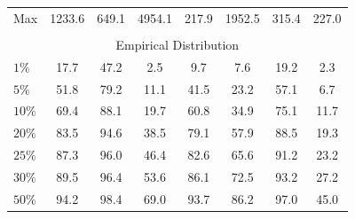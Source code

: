 \begin{center}
\begin{tabular*}{\textwidth}{@{\extracolsep{\fill}}lccccccc}
Max        & 1233.6& 649.1& 4954.1& 217.9& 1952.5& 315.4& 227.0\\ 
 \multicolumn{8}{c}{}\\ 
 \multicolumn{8}{c}{Empirical Distribution}\\ 
 \midrule 
$1\%$      & 17.7& 47.2& 2.5& 9.7& 7.6& 19.2& 2.3\\ 
$5\%$      & 51.8& 79.2& 11.1& 41.5& 23.2& 57.1& 6.7\\ 
$10\%$     & 69.4& 88.1& 19.7& 60.8& 34.9& 75.1& 11.7\\ 
$20\%$     & 83.5& 94.6& 38.5& 79.1& 57.9& 88.5& 19.3\\ 
$25\%$     & 87.3& 96.0& 46.4& 82.6& 65.6& 91.2& 23.2\\ 
$30\%$     & 89.5& 96.4& 53.6& 86.1& 72.5& 93.2& 27.2\\ 
$50\%$     & 94.2& 98.4& 69.0& 93.7& 86.2& 97.0& 45.0\\ 
\bottomrule 
\end{tabular*} 
\end{center}

